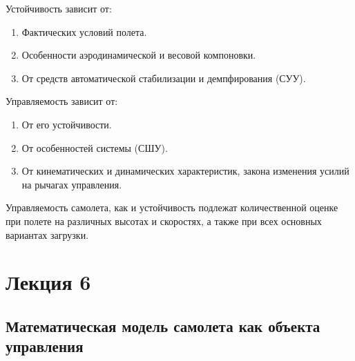 \documentclass{article}
\begin{document}
Устойчивость зависит от:
\begin{enumerate}
\item Фактических условий полета.
\item Особенности аэродинамической и весовой компоновки.
\item От средств автоматической стабилизации и демпфирования (СУУ).
\end{enumerate}
Управляемость зависит от:
\begin{enumerate}
\item От его устойчивости.
\item От особенностей системы (СШУ).
\item От кинематических и динамических характеристик, закона изменения усилий на рычагах управления.
\end{enumerate}

Управляемость самолета, как и устойчивость подлежат количественной оценке при полете на различных высотах и скоростях, а также при всех основных вариантах загрузки.

\newpage
\section{Лекция 6}
\subsection{Математическая модель самолета как объекта управления}
\end{document}
